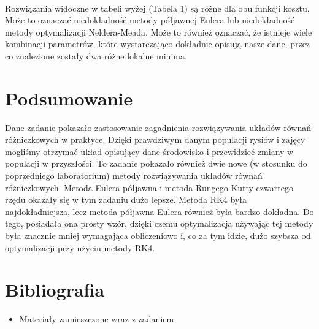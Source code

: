 \documentclass{article}
\begin{document}
\\
Rozwiązania widoczne w tabeli wyżej (Tabela 1) są różne dla obu funkcji kosztu. Może to oznaczać niedokładność metody półjawnej Eulera lub niedokładność metody optymalizacji Neldera-Meada. Może to również oznaczać, że istnieje wiele kombinacji parametrów, które wystarczająco dokładnie opisują nasze dane, przez co znalezione zostały dwa różne lokalne minima.

\section{Podsumowanie}
Dane zadanie pokazało zastosowanie zagadnienia rozwiązywania układów równań różniczkowych w praktyce. Dzięki prawdziwym danym populacji rysiów i zajęcy mogliśmy otrzymać układ opisujący dane środowisko i przewidzieć zmiany w populacji w przyszłości. To zadanie pokazało również dwie nowe (w stosunku do poprzedniego laboratorium) metody rozwiązywania układów równań różniczkowych. Metoda Eulera półjawna i metoda Rungego-Kutty czwartego rzędu okazały się w tym zadaniu dużo lepsze. Metoda RK4 była najdokładniejsza, lecz metoda półjawna Eulera również była bardzo dokładna. Do tego, posiadała ona prosty wzór, dzięki czemu optymalizacja używając tej metody była znacznie mniej wymagająca obliczeniowo i, co za tym idzie, dużo szybsza od optymalizacji przy użyciu metody RK4.

\section{Bibliografia}
\begin{itemize}
\item Materiały zamieszczone wraz z zadaniem
\end{itemize}
\end{document}
